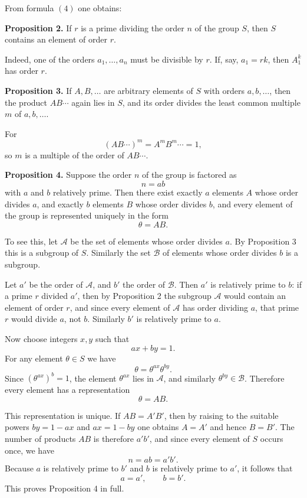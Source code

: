 \documentclass[11pt]{article}
\begin{document}
From formula \((4)\) one obtains:

\medskip
\noindent\textbf{Proposition 2.}
If \(r\) is a prime dividing the order \(n\) of the group \(S\), then \(S\) contains an element of order \(r\).

\medskip
Indeed, one of the orders \(a_1,\dots,a_n\) must be divisible by \(r\). If, say, \(a_1=rk\), then \(A_1^k\) has order \(r\).

\medskip
\noindent\textbf{Proposition 3.}
If \(A,B,\dots\) are arbitrary elements of \(S\) with orders \(a,b,\dots\), then the product \(AB\cdots\) again lies in \(S\), and its order divides the least common multiple \(m\) of \(a,b,\dots\).

\medskip
For
\[
(AB\cdots)^m=A^mB^m\cdots=1,
\]
so \(m\) is a multiple of the order of \(AB\cdots\).

\medskip
\noindent\textbf{Proposition 4.}
Suppose the order \(n\) of the group is factored as
\[
n=ab
\]
with \(a\) and \(b\) relatively prime. Then there exist exactly \(a\) elements \(A\) whose order divides \(a\), and exactly \(b\) elements \(B\) whose order divides \(b\), and every element of the group is represented uniquely in the form
\[
\theta=AB.
\tag{5}
\]

To see this, let \(\mathcal A\) be the set of elements whose order divides \(a\). By Proposition 3 this is a subgroup of \(S\). Similarly the set \(\mathcal B\) of elements whose order divides \(b\) is a subgroup.

Let \(a'\) be the order of \(\mathcal A\), and \(b'\) the order of \(\mathcal B\). Then \(a'\) is relatively prime to \(b\): if a prime \(r\) divided \(a'\), then by Proposition 2 the subgroup \(\mathcal A\) would contain an element of order \(r\), and since every element of \(\mathcal A\) has order dividing \(a\), that prime \(r\) would divide \(a\), not \(b\). Similarly \(b'\) is relatively prime to \(a\).

Now choose integers \(x,y\) such that
\[
ax+by=1.
\tag{6}
\]
For any element \(\theta\in S\) we have
\[
\theta=\theta^{ax}\theta^{by}.
\tag{7}
\]
Since \((\theta^{ax})^b=1\), the element \(\theta^{ax}\) lies in \(\mathcal A\), and similarly \(\theta^{by}\in\mathcal B\). Therefore every element has a representation
\[
\theta=AB.
\tag{8}
\]

This representation is unique. If \(AB=A'B'\), then by raising to the suitable powers \(by=1-ax\) and \(ax=1-by\) one obtains \(A=A'\) and hence \(B=B'\). The number of products \(AB\) is therefore \(a'b'\), and since every element of \(S\) occurs once, we have
\[
n=ab=a'b'.
\]
Because \(a\) is relatively prime to \(b'\) and \(b\) is relatively prime to \(a'\), it follows that
\[
a=a',\qquad b=b'.
\]
This proves Proposition 4 in full.
\end{document}
